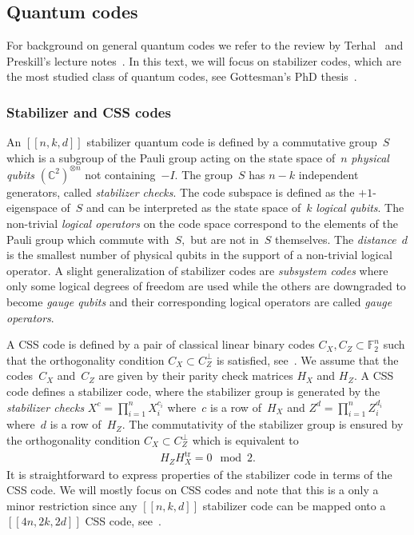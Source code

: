\documentclass[amsmath, amssymb, floatfix, reprint, twocolumn, notitlepage, 10pt]{revtex4-1}
\newcommand{\change}{}
\newcommand{\tr}{\operatorname{tr}}
\begin{document}
\subsection{Quantum codes}
For background on general quantum codes we refer to the review by Terhal~\cite{terhal2015quantum} and Preskill's lecture notes~\cite{preskill1998lecture}. %
In this text, we will focus on stabilizer codes, which are the most studied class of quantum codes, see Gottesman's PhD thesis~\cite{gottesman1997stabilizer}. 


\subsubsection{Stabilizer and CSS codes}
An $[[n,k,d]]$ stabilizer quantum code is defined by a commutative group~$S$ which is a subgroup of the Pauli group acting on the state space of~$n$ \emph{physical qubits} $(\mathbb{C}^2)^{\otimes n}$ {\change not containing~$-I$}.
The group~$S$ has $n-k$ independent generators, called \emph{stabilizer checks}.
The code subspace is defined as the $+1$-eigenspace of~$S$ and can be interpreted as the state space of~$k$ \emph{logical qubits}.
The {\change non-trivial} \emph{logical operators} on the code space correspond to the elements of the Pauli group which commute with~$S,$ but are not in~$S$ themselves.
The \emph{distance}~$d$ is the smallest number of physical qubits in the support of a non-trivial logical operator.
{\change
A slight generalization of stabilizer codes are \emph{subsystem codes} where only some logical degrees of freedom are used while the others are downgraded to become \emph{gauge qubits} and their corresponding logical operators are called \emph{gauge operators}. 
}

A CSS code is defined by a pair of classical linear binary codes $C_X,C_Z\subset\mathbb{F}^n_2$ such that the orthogonality condition $C_X\subset C_Z^\perp$ is satisfied, see~\cite{calderbank1998quantum}.
We assume that the codes~$C_X$ and~$C_Z$ are given by their parity check matrices $H_X$ and $H_Z.$
A CSS code defines a stabilizer code, where the stabilizer group is generated by the \emph{stabilizer checks} $X^c = \prod_{i=1}^n X_i^{c_i}$ where~$c$ is a row of~$H_X$ and $Z^d = \prod_{i=1}^n Z_i^{d_i}$ where~$d$ is a row of~$H_Z$.
The commutativity of the stabilizer group is ensured by the orthogonality condition $C_X\subset C_Z^\perp$ which is equivalent to
\begin{align}\label{eqn:CSS_commutativity_constraint}
H_Z H_X^{\tr} = 0 \mod 2.
\end{align}
It is straightforward to express properties of the stabilizer code in terms of the CSS code.
We will mostly focus on CSS codes and note that this is a only a minor restriction since any $[[n,k,d]]$ stabilizer code can be mapped onto a $[[4n,2k,2d]]$ CSS code, see~\cite{bravyi2010majorana}.
\end{document}
